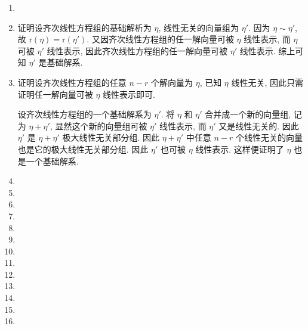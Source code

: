 \documentclass[a4paper, 11pt]{ctexart}
\newcommand{\rank}{\mathrm{r}}
\begin{document}
\begin{enumerate}
    \item %
    \item %
        {\heiti 证明}\quad 设齐次线性方程组的基础解析为 $\eta$, 线性无关的向量组为 $\eta'$.
        因为 $\eta \sim \eta'$, 故 $\rank(\eta) = \rank(\eta')$. 又因齐次线性方程组的任一解向量可被 $\eta$ 线性表示, 而 $\eta$ 可被 $\eta'$ 线性表示, 因此齐次线性方程组的任一解向量可被 $\eta'$ 线性表示.
        综上可知 $\eta'$ 是基础解系.
    \item %
        {\heiti 证明}\quad 设齐次线性方程组的任意 $n - r$ 个解向量为 $\eta$, 已知 $\eta$ 线性无关, 因此只需证明任一解向量可被 $\eta$ 线性表示即可.
        
        设齐次线性方程组的一个基础解系为 $\eta'$. 将 $\eta$ 和 $\eta'$ 合并成一个新的向量组, 记为 $\eta + \eta'$, 显然这个新的向量组可被 $\eta'$ 线性表示, 而 $\eta'$ 又是线性无关的.
        因此 $\eta'$ 是 $\eta + \eta'$ 极大线性无关部分组. 因此 $\eta + \eta'$ 中任意 $n - r$ 个线性无关的向量也是它的极大线性无关部分组. 因此 $\eta'$ 也可被 $\eta$ 线性表示.
        这样便证明了 $\eta$ 也是一个基础解系.  
    \item %
    \item %
    \item %
    \item %
    \item %
    \item %
    \item %
    \item %
    \item %
    \item %
    \item %
    \item %
    \item %
\end{enumerate}
\end{document}
